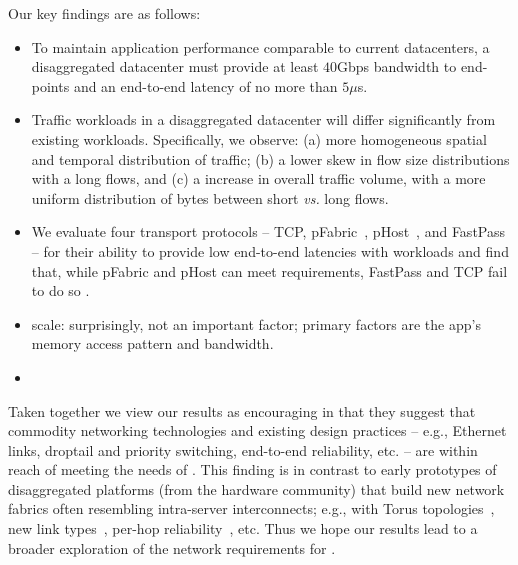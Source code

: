 \vspace{0.5em}
\noindent Our key findings are as follows:
\vspace{-0.5em}
\begin{itemize}[leftmargin=*]
\itemsep0em
	\item To maintain application performance comparable to current datacenters, a disaggregated datacenter must provide at least $40$Gbps bandwidth to end-points and an end-to-end latency of no more than $5\mu$s.
	\item Traffic workloads in a disaggregated datacenter will differ significantly from existing workloads. Specifically, we observe: (a)  more homogeneous spatial and temporal distribution of traffic; (b) a  lower skew in flow size distributions with a long flows, and (c) a  increase in overall traffic volume, with a  more uniform distribution of bytes between short {\em vs.} long flows.
	\item We evaluate four transport protocols -- TCP, pFabric~\cite{pfabric}, pHost~\cite{phost}, and  FastPass~\cite{fastpass} -- for their ability to provide low end-to-end latencies with \dis workloads and find that, while pFabric and pHost can meet \dis requirements, FastPass and TCP fail to do so . 
	\item {} scale: surprisingly, not an important factor; primary factors are the app's memory access pattern and bandwidth.
	\item {}
\end{itemize} 
	
\noindent	
Taken together we view our results as encouraging in that they suggest that commodity networking technologies and existing design practices -- e.g., Ethernet links, droptail and priority switching, end-to-end reliability, etc. -- are within reach of meeting the needs of \dis. This finding is in contrast to early prototypes of disaggregated platforms (from the hardware community) that build new network fabrics often resembling intra-server interconnects; e.g., with Torus  topologies~\cite{seamicro}, new link types~\cite{intel-si-photonics}, per-hop reliability~\cite{infiniband}, etc. Thus we hope our results lead to a broader exploration of the network requirements for \dis.
	
